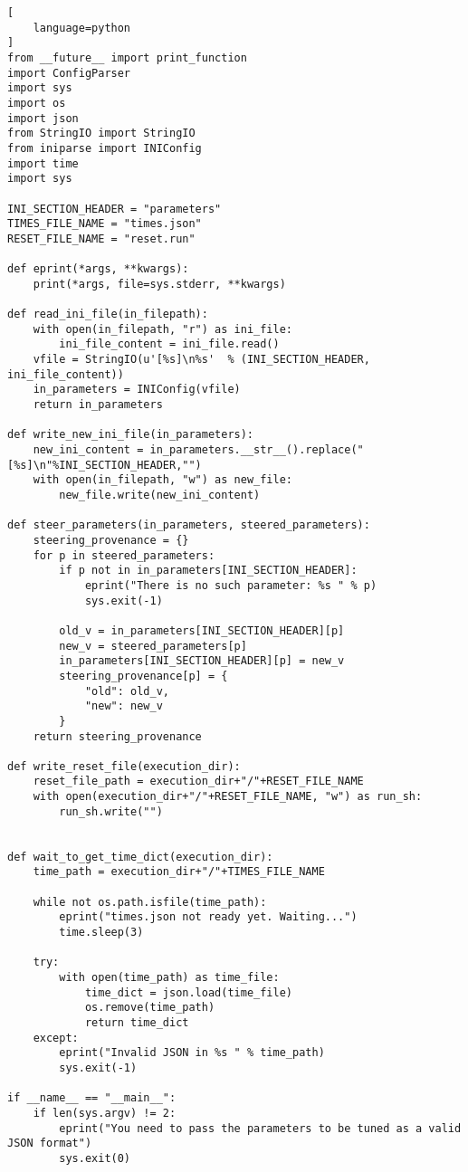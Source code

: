 \begin{lstlisting}[
    language=python
]
from __future__ import print_function
import ConfigParser
import sys
import os
import json
from StringIO import StringIO
from iniparse import INIConfig
import time
import sys

INI_SECTION_HEADER = "parameters"
TIMES_FILE_NAME = "times.json"
RESET_FILE_NAME = "reset.run"

def eprint(*args, **kwargs):
    print(*args, file=sys.stderr, **kwargs)

def read_ini_file(in_filepath):
    with open(in_filepath, "r") as ini_file:
        ini_file_content = ini_file.read()
    vfile = StringIO(u'[%s]\n%s'  % (INI_SECTION_HEADER, ini_file_content))
    in_parameters = INIConfig(vfile)
    return in_parameters

def write_new_ini_file(in_parameters):
    new_ini_content = in_parameters.__str__().replace("[%s]\n"%INI_SECTION_HEADER,"")
    with open(in_filepath, "w") as new_file:
        new_file.write(new_ini_content)

def steer_parameters(in_parameters, steered_parameters):
    steering_provenance = {}
    for p in steered_parameters:
        if p not in in_parameters[INI_SECTION_HEADER]:
            eprint("There is no such parameter: %s " % p)
            sys.exit(-1)

        old_v = in_parameters[INI_SECTION_HEADER][p]
        new_v = steered_parameters[p]
        in_parameters[INI_SECTION_HEADER][p] = new_v
        steering_provenance[p] = {
            "old": old_v,
            "new": new_v
        }
    return steering_provenance

def write_reset_file(execution_dir):
    reset_file_path = execution_dir+"/"+RESET_FILE_NAME
    with open(execution_dir+"/"+RESET_FILE_NAME, "w") as run_sh:
        run_sh.write("")


def wait_to_get_time_dict(execution_dir):
    time_path = execution_dir+"/"+TIMES_FILE_NAME

    while not os.path.isfile(time_path):
        eprint("times.json not ready yet. Waiting...")
        time.sleep(3)

    try:
        with open(time_path) as time_file:
            time_dict = json.load(time_file)
            os.remove(time_path)
            return time_dict
    except:
        eprint("Invalid JSON in %s " % time_path)
        sys.exit(-1)

if __name__ == "__main__":
    if len(sys.argv) != 2:
        eprint("You need to pass the parameters to be tuned as a valid JSON format")
        sys.exit(0)


\end{lstlisting}

